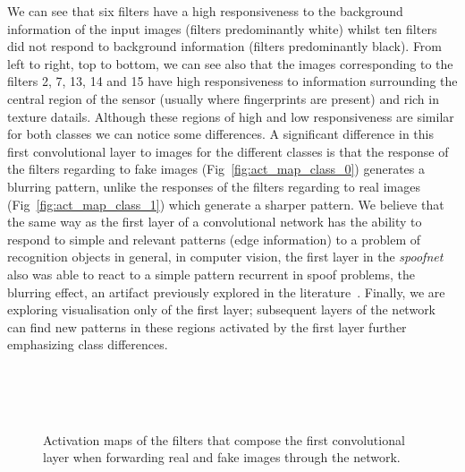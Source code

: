 We can see that six filters have a high responsiveness to the background information of the input images (filters predominantly white) whilst ten filters did not respond to background information (filters predominantly black). From left to right, top to bottom, we can see  also that the images corresponding to the filters 2, 7, 13, 14 and 15 have high responsiveness to information surrounding the central region of the sensor (usually where fingerprints are present) and rich in texture datails. Although these regions of high and low responsiveness are similar for both classes we can notice some differences. A significant difference in this first convolutional layer to images for the different classes is that the response of the filters regarding to fake images (Fig~\ref{fig:act_map_class_0}) generates a blurring pattern, unlike the responses of the filters regarding to real images (Fig~\ref{fig:act_map_class_1}) which generate a sharper pattern. We believe that the same way as the first layer of a convolutional network has the ability to respond to simple and relevant patterns (edge information) to a problem of recognition objects in general, in computer vision, the first layer in the \textit{spoofnet} also was able to react to a simple pattern recurrent in spoof problems, the blurring effect, an artifact previously explored in the literature~\cite{Galbally:TIP:2014}. Finally, we are exploring visualisation only of the first layer; subsequent layers of the network can find new patterns in these regions activated by the first layer further emphasizing class differences. 

\begin{figure}
\centering
{}\\
\hspace{1mm}
\\
\hspace{1mm}
\\

\caption{Activation maps of the filters that compose the first convolutional layer when forwarding real and fake images through the network.}
\end{figure}


